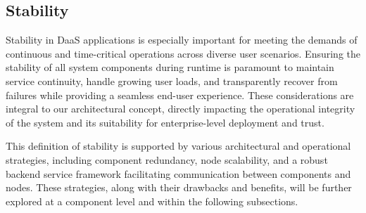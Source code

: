 \documentclass[runningheads]{llncs}
\begin{document}
\subsection{Stability}
%

Stability in DaaS applications is especially important
for meeting the demands of continuous and time-critical operations
across diverse user scenarios.
Ensuring the stability of all system components during runtime is paramount
to maintain service continuity, handle growing user loads,
and transparently recover from failures
while providing a seamless end-user experience.
These considerations are integral to our architectural concept,
directly impacting the operational integrity of the system
and its suitability for enterprise-level deployment and trust.

This definition of stability is supported
by various architectural and operational strategies,
including component redundancy, node scalability,
and a robust backend service framework facilitating communication
between components and nodes.
These strategies, along with their drawbacks and benefits,
will be further explored at a component level
and within the following subsections.
\end{document}
